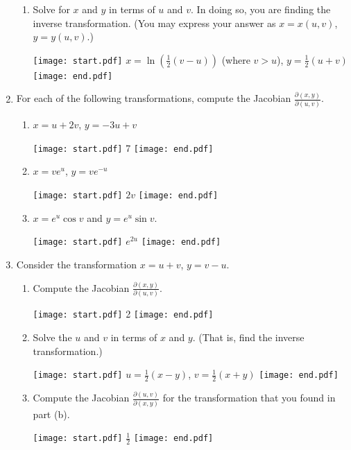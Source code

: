 \documentclass[12pt]{article}
\begin{document}
\begin{enumerate}
\begin{enumerate}
\item Solve for $x$ and $y$ in terms of $u$ and $v$.  In doing so, you are finding the inverse transformation.  (You may express your answer as $x=x(u,v)$, $y=y(u,v)$.)

\texttt{[image: start.pdf]}
{{$x=\ln\left(\frac{1}{2}(v-u)\right)$ (where $v>u$), $y=\frac{1}{2}(u+v)$}}
\texttt{[image: end.pdf]}


\end{enumerate}

\item For each of the following transformations, compute the Jacobian $\frac{\partial(x,y)}{\partial(u,v)}$.

\begin{enumerate}

\item $x=u+2v$, $y=-3u+v$

\texttt{[image: start.pdf]}
{{7}}
\texttt{[image: end.pdf]}


\item $x=ve^u$, $y=ve^{-u}$

\texttt{[image: start.pdf]}
{{$2v$}}
\texttt{[image: end.pdf]}


\item $x=e^{u}\cos{v}$ and $y=e^{u}\sin{v}$.  

\texttt{[image: start.pdf]}
{{$e^{2u}$}}
\texttt{[image: end.pdf]}


\end{enumerate}

\item Consider the transformation $x=u+v$, $y=v-u$.

\begin{enumerate}

\item Compute the Jacobian $\frac{\partial(x,y)}{\partial(u,v)}$.

\texttt{[image: start.pdf]}
{{2}}
\texttt{[image: end.pdf]}


\item Solve the $u$ and $v$ in terms of $x$ and $y$. (That is, find the inverse transformation.)

\texttt{[image: start.pdf]}
{{$u=\frac{1}{2}(x-y)$, $v=\frac{1}{2}(x+y)$}}
\texttt{[image: end.pdf]}


\item Compute the Jacobian $\frac{\partial(u,v)}{\partial(x,y)}$ for the transformation that you found in part (b).

\texttt{[image: start.pdf]}
{{$\frac{1}{2}$}}
\texttt{[image: end.pdf]}



\end{enumerate}
\end{enumerate}
\end{document}
